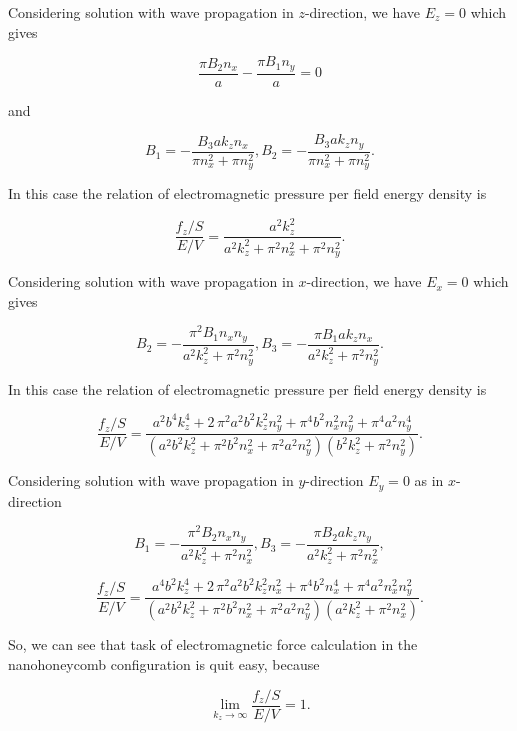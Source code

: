 \documentclass[twoside, 10pt, ptm]{article}
\begin{document}
\begin{multicols}{2}
Considering solution with wave propagation in \(z\)-direction, we have
\(E_z = 0\) which gives

\[\frac{\pi B_{2} n_{x}}{a} - \frac{\pi B_{1} n_{y}}{a} = 0\]

and

\[B_1 = -\frac{B_{3} a k_{z} n_{x}}{\pi n_{x}^{2} + \pi n_{y}^{2}},
B_2 = -\frac{B_{3} a k_{z} n_{y}}{\pi n_{x}^{2} + \pi n_{y}^{2}}.\]

In this case the relation of electromagnetic pressure per field energy density is

\begin{equation}\frac{f_z/S}{E/V} = \frac{a^{2} k_{z}^{2}}{a^{2} k_{z}^{2} + \pi^{2} n_{x}^{2} + \pi^{2} n_{y}^{2}}.\end{equation}

    Considering solution with wave propagation in \(x\)-direction, we have
\(E_x = 0\) which gives

\[B_2 = -\frac{\pi^{2} B_{1} n_{x} n_{y}}{a^{2} k_{z}^{2} + \pi^{2} n_{y}^{2}},
B_3 = -\frac{\pi B_{1} a k_{z} n_{x}}{a^{2} k_{z}^{2} + \pi^{2} n_{y}^{2}}.\]

In this case the relation of electromagnetic pressure per field energy density is

\[\frac{f_z/S}{E/V} = \frac{a^{2} b^{4} k_{z}^{4} + 2 \, \pi^{2} a^{2} b^{2} k_{z}^{2} n_{y}^{2} + \pi^{4} b^{2} n_{x}^{2} n_{y}^{2} + \pi^{4} a^{2} n_{y}^{4}}{{\left(a^{2} b^{2} k_{z}^{2} + \pi^{2} b^{2} n_{x}^{2} + \pi^{2} a^{2} n_{y}^{2}\right)} {\left(b^{2} k_{z}^{2} + \pi^{2} n_{y}^{2}\right)}}.\]

Considering solution with wave propagation in \(y\)-direction
\(E_y = 0\) as in \(x\)-direction

    \[B_1 = -\frac{\pi^{2} B_{2} n_{x} n_{y}}{a^{2} k_{z}^{2} + \pi^{2} n_{x}^{2}},
      B_3 = -\frac{\pi B_{2} a k_{z} n_{y}}{a^{2} k_{z}^{2} + \pi^{2} n_{x}^{2}},\]

\[\frac{f_z/S}{E/V} = \frac{a^{4} b^{2} k_{z}^{4} + 2 \, \pi^{2} a^{2} b^{2} k_{z}^{2} n_{x}^{2} + \pi^{4} b^{2} n_{x}^{4} + \pi^{4} a^{2} n_{x}^{2} n_{y}^{2}}{{\left(a^{2} b^{2} k_{z}^{2} + \pi^{2} b^{2} n_{x}^{2} + \pi^{2} a^{2} n_{y}^{2}\right)} {\left(a^{2} k_{z}^{2} + \pi^{2} n_{x}^{2}\right)}}.\]

    So, we can see that task of electromagnetic force calculation in the
nanohoneycomb configuration is quit easy, because

\begin{equation}\lim_{k_z \to \infty}\frac{f_z/S}{E/V} = 1.\end{equation}


\end{multicols}
\end{document}
